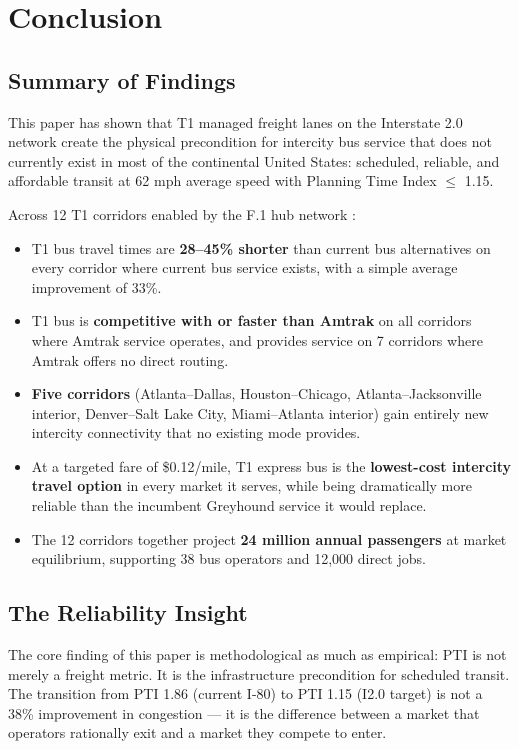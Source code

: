 \section{Conclusion}
\label{sec:conclusion}

\subsection{Summary of Findings}

This paper has shown that T1 managed freight lanes on the Interstate 2.0 network create the physical precondition for intercity bus service that does not currently exist in most of the continental United States: scheduled, reliable, and affordable transit at 62 mph average speed with Planning Time Index $\leq$ 1.15.

Across 12 T1 corridors enabled by the F.1 hub network \citep{ROUTE_F1}:
\begin{itemize}
  \item T1 bus travel times are \textbf{28--45\% shorter} than current bus alternatives on every corridor where current bus service exists, with a simple average improvement of 33\%.
  \item T1 bus is \textbf{competitive with or faster than Amtrak} on all corridors where Amtrak service operates, and provides service on 7 corridors where Amtrak offers no direct routing.
  \item \textbf{Five corridors} (Atlanta--Dallas, Houston--Chicago, Atlanta--Jacksonville interior, Denver--Salt Lake City, Miami--Atlanta interior) gain entirely new intercity connectivity that no existing mode provides.
  \item At a targeted fare of \$0.12/mile, T1 express bus is the \textbf{lowest-cost intercity travel option} in every market it serves, while being dramatically more reliable than the incumbent Greyhound service it would replace.
  \item The 12 corridors together project \textbf{24 million annual passengers} at market equilibrium, supporting 38 bus operators and 12,000 direct jobs.
\end{itemize}

\subsection{The Reliability Insight}

The core finding of this paper is methodological as much as empirical: PTI is not merely a freight metric. It is the infrastructure precondition for scheduled transit. The transition from PTI 1.86 (current I-80) to PTI 1.15 (I2.0 target) is not a 38\% improvement in congestion --- it is the difference between a market that operators rationally exit and a market they compete to enter.

